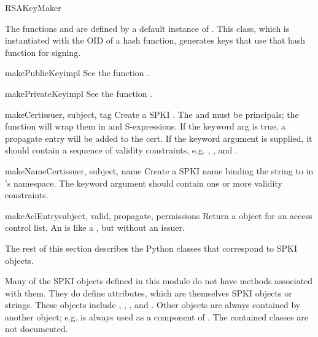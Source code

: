 \documentclass{howto}
\begin{document}
\begin{classdesc}{RSAKeyMaker}{}

The functions  and 
are defined by a default instance of .  This class,
which is instantiated with the OID of a hash function, generates keys
that use that hash function for signing.

\begin{methoddesc}{makePublicKey}{impl}
See the function .
\end{methoddesc}

\begin{methoddesc}{makePrivateKey}{impl}
See the function .
\end{methoddesc}

\end{classdesc}

\begin{funcdesc}{makeCert}{issuer, subject, tag}
Create a SPKI .  The  and  must be
principals; the function will wrap them in  and
 S-expressions.  If the  keyword arg is
true, a propagate entry will be added to the cert.  If the 
keyword argument is supplied, it should contain a sequence of validity
constraints, e.g. , , and .
\end{funcdesc}

\begin{funcdesc}{makeNameCert}{issuer, subject, name}
Create a SPKI name  binding the string  to
 in 's namespace.  The  keyword
argument should contain one or more validity constraints.
\end{funcdesc}

\begin{funcdesc}{makeAclEntry}{subject, valid, propagate, permissions}
Return a  object for an access control list.  An
 is like a , but without an issuer.
\end{funcdesc}

The rest of this section describes the Python classes that correspond
to SPKI objects.

Many of the SPKI objects defined in this module do not have methods
associated with them.  They do define attributes, which are themselves
SPKI objects or strings.  These objects include ,
, , and .  Other objects are
always contained by another object; e.g.  is
always used as a component of .  The contained
classes are not documented.
\end{document}
